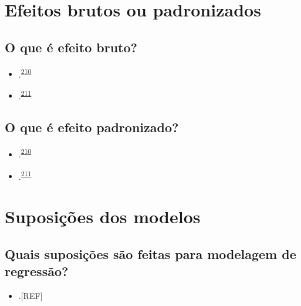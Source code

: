 \documentclass[
  a4paper,
]{book}
\providecommand{\tightlist}{%
  \setlength{\itemsep}{0pt}\setlength{\parskip}{0pt}}
\begin{document}
\hypertarget{suposicoes-modelos}{%
\section{Efeitos brutos ou padronizados}\label{suposicoes-modelos}}

\hypertarget{o-que-uxe9-efeito-bruto}{%
\subsection{O que é efeito bruto?}\label{o-que-uxe9-efeito-bruto}}

\begin{itemize}
\item
  .\textsuperscript{\protect\hyperlink{ref-greenland1986}{210}}
\item
  .\textsuperscript{\protect\hyperlink{ref-greenland1991}{211}}
\end{itemize}

\hypertarget{o-que-uxe9-efeito-padronizado}{%
\subsection{O que é efeito padronizado?}\label{o-que-uxe9-efeito-padronizado}}

\begin{itemize}
\item
  .\textsuperscript{\protect\hyperlink{ref-greenland1986}{210}}
\item
  .\textsuperscript{\protect\hyperlink{ref-greenland1991}{211}}
\end{itemize}

\hypertarget{suposiuxe7uxf5es-dos-modelos}{%
\section{Suposições dos modelos}\label{suposiuxe7uxf5es-dos-modelos}}

\hypertarget{quais-suposiuxe7uxf5es-suxe3o-feitas-para-modelagem-de-regressuxe3o}{%
\subsection{Quais suposições são feitas para modelagem de regressão?}\label{quais-suposiuxe7uxf5es-suxe3o-feitas-para-modelagem-de-regressuxe3o}}

\begin{itemize}
\tightlist
\item
  .{[}REF{]}
\end{itemize}
\end{document}

